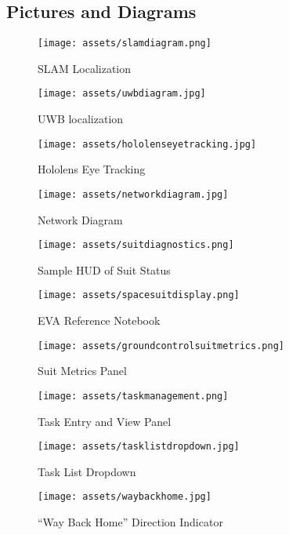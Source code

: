 \documentclass{article}
\let\Oldsubsection\subsection
\renewcommand{\subsection}{\FloatBarrier\Oldsubsection}
\begin{document}
\subsection{Pictures and Diagrams}

\begin{figure}[!htb]
  \centering
  \texttt{[image: assets/slamdiagram.png]}
  \caption{SLAM Localization}
  \label{fig:slamdiagram}
\end{figure}

\begin{figure}[!htb]
  \centering
  \texttt{[image: assets/uwbdiagram.jpg]}
  \caption{UWB localization}
  \label{fig:uwbdiagram}
\end{figure}

\begin{figure}[!htb]
  \centering
  \texttt{[image: assets/hololenseyetracking.jpg]}
  \caption{Hololens Eye Tracking}
  \label{fig:hololenseyetracking}
\end{figure}

\begin{figure}[!htb]
  \centering
  \texttt{[image: assets/networkdiagram.jpg]}
  \caption{Network Diagram}
  \label{fig:networkdiagram}
\end{figure}

\begin{figure}[!htb]
  \centering
  \texttt{[image: assets/suitdiagnostics.png]}
  \caption{Sample HUD of Suit Status}
  \label{fig:suitdiagnostics}
\end{figure}

\begin{figure}[!htb]
  \centering
  \texttt{[image: assets/spacesuitdisplay.png]}
  \caption{EVA Reference Notebook}
  \label{fig:spacesuitdisplay}
\end{figure}

\begin{figure}[!htb]
  \centering
  \texttt{[image: assets/groundcontrolsuitmetrics.png]}
  \caption{Suit Metrics Panel}
  \label{fig:groundcontrolsuitmetrics}
\end{figure}

\begin{figure}[!htb]
  \centering
  \texttt{[image: assets/taskmanagement.png]}
  \caption{Task Entry and View Panel}
  \label{fig:taskmanagment}
\end{figure}

\begin{figure}[!htb]
  \centering
  \texttt{[image: assets/tasklistdropdown.jpg]}
  \caption{Task List Dropdown}
  \label{fig:tasklistdropdown}
\end{figure}

\pagebreak

\begin{figure}[!htb]
  \centering
  \texttt{[image: assets/waybackhome.jpg]}
  \caption{“Way Back Home” Direction Indicator}
  \label{fig:wayhome}
\end{figure}
\end{document}
